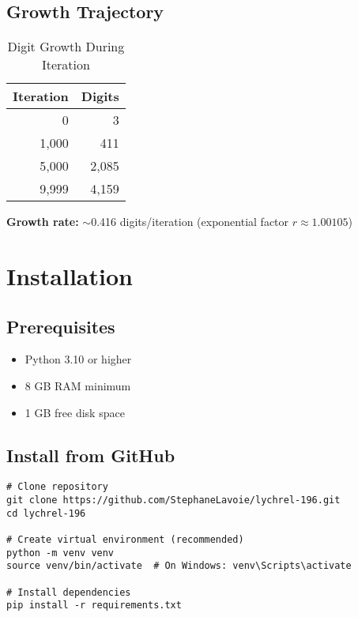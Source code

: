 \documentclass[11pt,a4paper]{article}
\begin{document}
\subsection{Growth Trajectory}

\begin{table}[H]
\centering
\caption{Digit Growth During Iteration}
\begin{tabular}{@{}rr@{}}
\toprule
\textbf{Iteration} & \textbf{Digits} \\
\midrule
0 & 3 \\
1,000 & 411 \\
5,000 & 2,085 \\
9,999 & 4,159 \\
\bottomrule
\end{tabular}
\end{table}

\textbf{Growth rate:} $\sim$0.416 digits/iteration (exponential factor $r \approx 1.00105$)

\section{Installation}

\subsection{Prerequisites}

\begin{itemize}[leftmargin=*]
\item Python 3.10 or higher
\item 8 GB RAM minimum
\item 1 GB free disk space
\end{itemize}

\subsection{Install from GitHub}

\begin{lstlisting}[style=bashstyle, caption={Installation from GitHub}]
# Clone repository
git clone https://github.com/StephaneLavoie/lychrel-196.git
cd lychrel-196

# Create virtual environment (recommended)
python -m venv venv
source venv/bin/activate  # On Windows: venv\Scripts\activate

# Install dependencies
pip install -r requirements.txt
\end{lstlisting}
\end{document}
